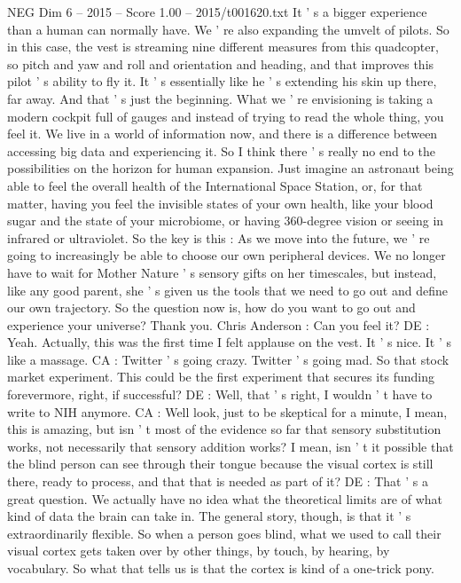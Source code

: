 \begin{textsample}{NEG Dim 6 – 2015 – Score 1.00 – 2015/t001620.txt}
It ' s a bigger experience than a human can normally have.
We ' re also expanding the umvelt of pilots.
So in this case, the vest is streaming nine different measures from this quadcopter, so pitch and yaw and roll and orientation and heading, and that improves this pilot ' s ability to fly it.
It ' s essentially like he ' s extending his skin up there, far away.
And that ' s just the beginning.
What we ' re envisioning is taking a modern cockpit full of gauges and instead of trying to read the whole thing, you feel it.
We live in a world of information now, and there is a difference between accessing big data and experiencing it.
So I think there ' s really no end to the possibilities on the horizon for human expansion.
Just imagine an astronaut being able to feel the overall health of the International Space Station, or, for that matter, having you feel the invisible states of your own health, like your blood sugar and the state of your microbiome, or having 360-degree vision or seeing in infrared or ultraviolet.
So the key is this : As we move into the future, we ' re going to increasingly be able to choose our own peripheral devices.
We no longer have to wait for Mother Nature ' s sensory gifts on her timescales, but instead, like any good parent, she ' s given us the tools that we need to go out and define our own trajectory.
So the question now is, how do you want to go out and experience your universe?
Thank you.
Chris Anderson : Can you feel it?
DE : Yeah.
Actually, this was the first time I felt applause on the vest.
It ' s nice.
It ' s like a massage.
CA : Twitter ' s going crazy.
Twitter ' s going mad.
So that stock market experiment.
This could be the first experiment that secures its funding forevermore, right, if successful?
DE : Well, that ' s right, I wouldn ' t have to write to NIH anymore.
CA : Well look, just to be skeptical for a minute, I mean, this is amazing, but isn ' t most of the evidence so far that sensory substitution works, not necessarily that sensory addition works?
I mean, isn ' t it possible that the blind person can see through their tongue because the visual cortex is still there, ready to process, and that that is needed as part of it?
DE : That ' s a great question.
We actually have no idea what the theoretical limits are of what kind of data the brain can take in.
The general story, though, is that it ' s extraordinarily flexible.
So when a person goes blind, what we used to call their visual cortex gets taken over by other things, by touch, by hearing, by vocabulary.
So what that tells us is that the cortex is kind of a one-trick pony.

\end{textsample}
